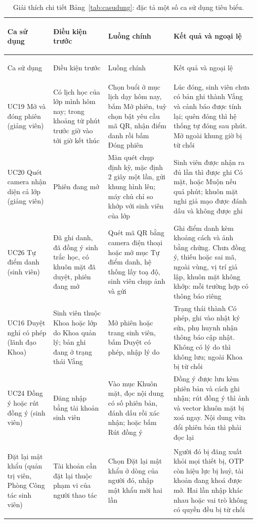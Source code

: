 {\footnotesize
\begin{xltabular}{\textwidth}{@{}>{\bfseries\raggedright\arraybackslash\leavevmode}p{2.6cm} >{\raggedright\arraybackslash\leavevmode}p{3.2cm} >{\raggedright\arraybackslash\leavevmode}X >{\raggedright\arraybackslash\leavevmode}X@{}}
\caption{Giải thích chi tiết Bảng~\ref{tab:casudung}: đặc tả một số ca sử dụng tiêu biểu.}
\label{tab:casudung-gt}\\
\toprule
Ca sử dụng & Điều kiện trước & Luồng chính & Kết quả và ngoại lệ \\
\midrule
\endfirsthead
\toprule
Ca sử dụng & Điều kiện trước & Luồng chính & Kết quả và ngoại lệ \\
\midrule
\endhead
\bottomrule
\endfoot
UC19 Mở và đóng phiên (giảng viên) & Có lịch học của lớp mình hôm nay; trong khoảng từ \FphutMoSom{} phút trước giờ vào tới giờ kết thúc & Chọn buổi ở mục lịch dạy hôm nay, bấm Mở phiên, tuỳ chọn bật yêu cầu mã QR, nhận điểm danh rồi bấm Đóng phiên & Lúc đóng, sinh viên chưa có bản ghi thành Vắng và cảnh báo được tính lại; quên đóng thì hệ thống tự đóng sau \FphutAnHan{} phút. Mở ngoài khung giờ bị từ chối \\
UC20 Quét camera nhận diện cả lớp (giảng viên) & Phiên đang mở & Màn quét chụp định kỳ, mặc định 2 giây một lần, gửi khung hình lên; máy chủ chỉ so khớp với sinh viên của lớp & Sinh viên được nhận ra đủ \FsoKhungXacNhan{} lần thì được ghi Có mặt, hoặc Muộn nếu quá \FphutMuon{} phút; khuôn mặt nghi giả mạo được đánh dấu và không được ghi \\
UC26 Tự điểm danh (sinh viên) & Đã ghi danh, đã đồng ý sinh trắc học, có khuôn mặt đã duyệt, phiên đang mở & Quét mã QR bằng camera điện thoại hoặc mở mục Tự điểm danh, hệ thống lấy toạ độ, sinh viên chụp ảnh và gửi & Ghi điểm danh kèm khoảng cách và ảnh bằng chứng. Chưa đồng ý, thiếu hoặc sai mã, ngoài vùng, vị trí giả lập, khuôn mặt không khớp: mỗi trường hợp có thông báo riêng \\
UC16 Duyệt nghỉ có phép (lãnh đạo Khoa) & Sinh viên thuộc Khoa hoặc lớp do Khoa quản lý; bản ghi đang ở trạng thái Vắng & Mở phiên hoặc trang sinh viên, bấm Duyệt có phép, nhập lý do & Trạng thái thành Có phép, ghi vào nhật ký sửa, phụ huynh nhận thông báo cập nhật. Không có lý do thì không lưu; ngoài Khoa bị từ chối \\
UC24 Đồng ý hoặc rút đồng ý (sinh viên) & Đăng nhập bằng tài khoản sinh viên & Vào mục Khuôn mặt, đọc nội dung có số phiên bản, đánh dấu rồi xác nhận; hoặc bấm Rút đồng ý & Đồng ý được lưu kèm phiên bản và cách ghi nhận; rút đồng ý thì ảnh và vector khuôn mặt bị xoá ngay. Nội dung vừa đổi phiên bản thì phải đọc lại \\
Đặt lại mật khẩu (quản trị viên, Phòng Công tác sinh viên) & Tài khoản cần đặt lại thuộc phạm vi của người thao tác & Chọn Đặt lại mật khẩu ở dòng của người đó, nhập mật khẩu mới hai lần & Người đó bị đăng xuất khỏi mọi thiết bị, OTP còn hiệu lực bị huỷ, tài khoản đang khoá được mở. Hai lần nhập khác nhau hoặc vai trò không có quyền đều bị từ chối \\
\end{xltabular}}

